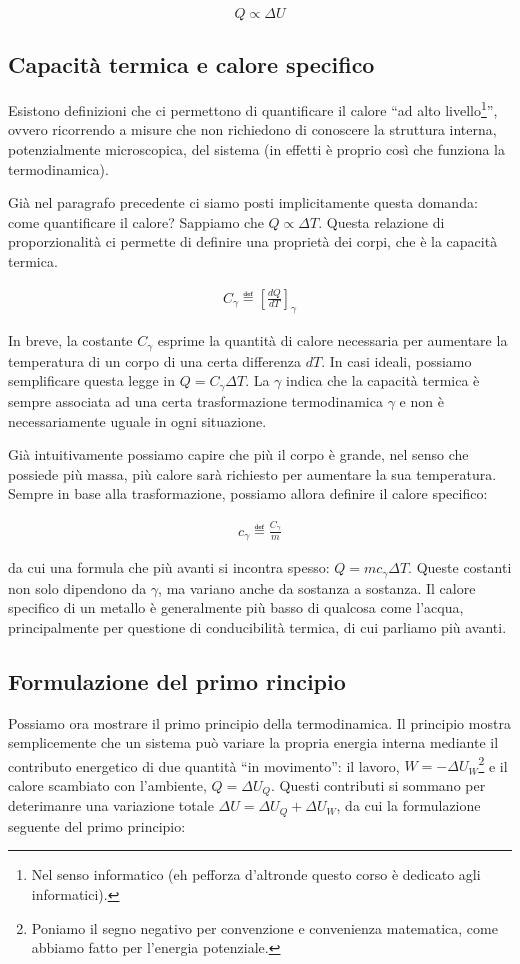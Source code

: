 \[ Q \propto \Delta U \]


\subsection{Capacità termica e calore specifico}
Esistono definizioni che ci permettono di quantificare il calore
``ad alto livello\footnote{Nel senso informatico (eh pefforza
d'altronde questo corso è dedicato agli informatici).}'', ovvero
ricorrendo a misure che non richiedono di conoscere la struttura
interna, potenzialmente microscopica, del sistema (in effetti
è proprio così che funziona la termodinamica).

Già nel paragrafo
precedente ci siamo posti implicitamente questa domanda: come
quantificare il calore? Sappiamo che $Q \propto \Delta T$.
Questa relazione di proporzionalità ci permette di definire una
proprietà dei corpi, che è la capacità termica.

\begin{align}
    C_\gamma \eqdef \left[ \frac{dQ}{dT} \right]_\gamma
\end{align}

\noindent In breve, la costante $C_\gamma$ esprime la quantità di calore
necessaria per aumentare la temperatura di un corpo di una
certa differenza $dT$. In casi ideali, possiamo semplificare
questa legge in $Q = C_\gamma \Delta T$. La $\gamma$ indica che
la capacità termica è sempre associata ad una certa trasformazione
termodinamica $\gamma$ e non è necessariamente uguale in ogni
situazione.

Già intuitivamente possiamo capire che più il corpo è grande,
nel senso che possiede più massa, più calore sarà richiesto per
aumentare la sua temperatura. Sempre in base alla trasformazione,
possiamo allora definire il calore specifico:

\begin{align}
    c_\gamma \eqdef \frac{C_\gamma}{m}
\end{align}

\noindent da cui una formula che più avanti si incontra spesso:
$Q = mc_\gamma \Delta T$. Queste costanti non solo dipendono da
$\gamma$, ma variano anche da sostanza a sostanza. Il calore
specifico di un metallo è generalmente più basso di qualcosa
come l'acqua, principalmente per questione di conducibilità termica,
di cui parliamo più avanti.


\subsection{Formulazione del primo rincipio}
Possiamo ora mostrare il primo principio della termodinamica. Il principio
mostra semplicemente che un sistema può variare la propria energia interna
mediante il contributo energetico di due quantità ``in movimento'': il lavoro,
$W = -\Delta U_W$\footnote{Poniamo il segno negativo per convenzione e convenienza matematica, come abbiamo fatto per l'energia potenziale.}
e il calore scambiato con l'ambiente, $Q = \Delta U_Q$. Questi contributi si sommano per deterimanre una
variazione totale $\Delta U = \Delta U_Q  + \Delta U_W$, da cui la formulazione
seguente del primo principio:

